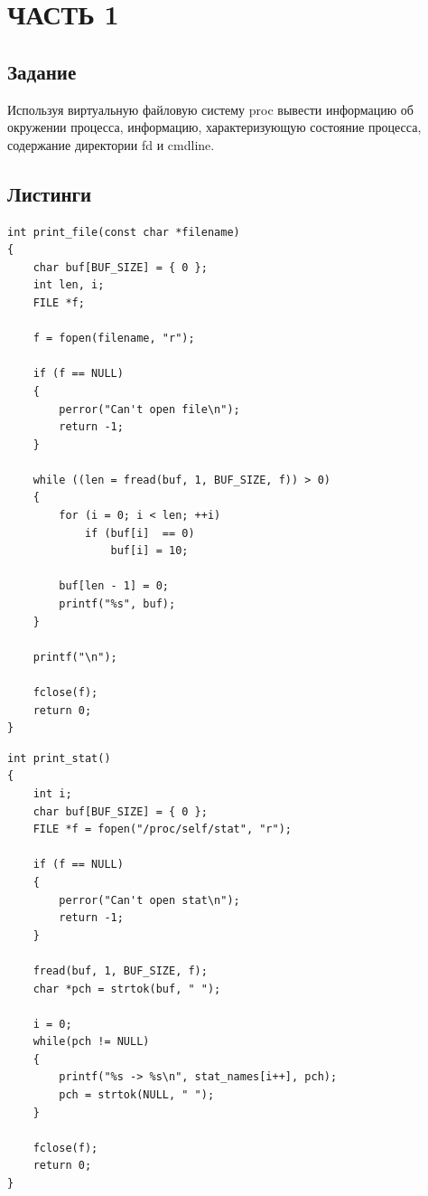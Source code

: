 \section{ЧАСТЬ 1}

\subsection{Задание}

Используя виртуальную файловую систему {\ttfamily proc} вывести
информацию об окружении процесса, информацию, характеризующую
состояние процесса, содержание директории {\ttfamily fd} и
{\ttfamily cmdline}.

\subsection{Листинги}

\begin{lstlisting}[caption=Вывод содержимого файла]
int print_file(const char *filename)
{
    char buf[BUF_SIZE] = { 0 };
    int len, i;
    FILE *f;

    f = fopen(filename, "r");

    if (f == NULL)
    {
        perror("Can't open file\n");
        return -1;
    }

    while ((len = fread(buf, 1, BUF_SIZE, f)) > 0)
    {
        for (i = 0; i < len; ++i)
            if (buf[i]  == 0)
                buf[i] = 10;

        buf[len - 1] = 0;
        printf("%s", buf);
    }

    printf("\n");

    fclose(f);
    return 0;
}
\end{lstlisting}

\begin{lstlisting}[caption=Вывод содержимого файла {\ttfamily stat}]
int print_stat()
{
    int i;
    char buf[BUF_SIZE] = { 0 };
    FILE *f = fopen("/proc/self/stat", "r");

    if (f == NULL)
    {
        perror("Can't open stat\n");
        return -1;
    }

    fread(buf, 1, BUF_SIZE, f);
    char *pch = strtok(buf, " ");

    i = 0;
    while(pch != NULL)
    {
        printf("%s -> %s\n", stat_names[i++], pch);
        pch = strtok(NULL, " ");
    }

    fclose(f);
    return 0;
}
\end{lstlisting}

